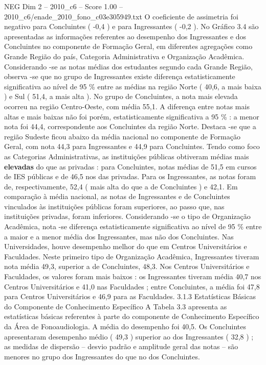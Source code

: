 \begin{textsample}{NEG Dim 2 – 2010\_c6 – Score 1.00 – 2010\_c6/enade\_2010\_fono\_c03e305949.txt}
O coeficiente de assimetria foi negativo para Concluintes ( -0,4 ) e para Ingressantes ( -0,2 ).
No Gráfico 3.4 são apresentadas as informações referentes ao desempenho dos Ingressantes e dos Concluintes no componente de Formação Geral, em diferentes agregações como Grande Região do país, Categoria Administrativa e Organização Acadêmica.
Considerando -se as notas médias dos estudantes segundo cada Grande Região, observa -se que no grupo de Ingressantes existe diferença estatisticamente significativa ao nível de 95 \% entre as médias na região Norte ( 40,6, a mais baixa ) e Sul ( 51,4, a mais alta ).
No grupo de Concluintes, a nota mais elevada ocorreu na região Centro-Oeste, com média 55,1.
A diferença entre notas mais altas e mais baixas não foi porém, estatisticamente significativa a 95 \% : a menor nota foi 44,4, correspondente aos Concluintes da região Norte.
Destaca -se que a região Sudeste ficou abaixo da média nacional no componente de Formação Geral, com nota 44,3 para Ingressantes e 44,9 para Concluintes.
Tendo como foco as Categorias Administrativas, as instituições públicas obtiveram médias mais \textbf{elevadas} do que as privadas : para Concluintes, notas médias de 51,5 em cursos de IES públicas e de 46,5 nos das privadas.
Para os Ingressantes, as notas foram de, respectivamente, 52,4 ( mais alta do que a de Concluintes ) e 42,1.
Em comparação à média nacional, as notas de Ingressantes e de Concluintes vinculados às instituições públicas foram superiores, ao passo que, nas instituições privadas, foram inferiores.
Considerando -se o tipo de Organização Acadêmica, nota -se diferença estatisticamente significativa ao nível de 95 \% entre a maior e a menor média dos Ingressantes, mas não dos Concluintes.
Nas Universidades, houve desempenho melhor do que em Centros Universitários e Faculdades.
Neste primeiro tipo de Organização Acadêmica, Ingressantes tiveram nota média 49,3, superior a de Concluintes, 48,3.
Nos Centros Universitários e Faculdades, os valores foram mais baixos : os Ingressantes tiveram média 40,7 nos Centros Universitários e 41,0 nas Faculdades ; entre Concluintes, a média foi 47,8 para Centros Universitários e 46,9 para as Faculdades. 3.1.3 Estatísticas Básicas do Componente de Conhecimento Específico A Tabela 3.3 apresenta as estatísticas básicas referentes à parte do componente de Conhecimento Específico da Área de Fonoaudiologia.
A média do desempenho foi 40,5.
Os Concluintes apresentaram desempenho médio ( 49,3 ) superior ao dos Ingressantes ( 32,8 ) ; as medidas de dispersão – desvio padrão e amplitude geral das notas – são menores no grupo dos Ingressantes do que no dos Concluintes.

\end{textsample}
